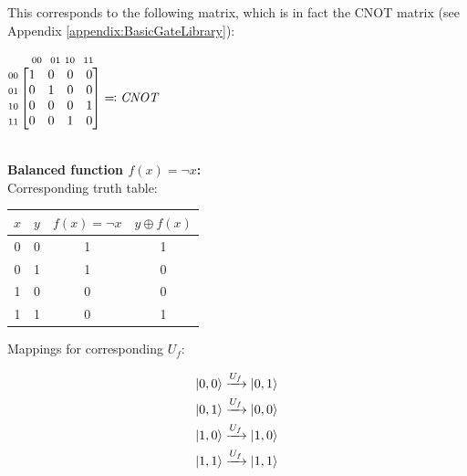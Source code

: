 \documentclass[conference]{IEEEtran}
\begin{document}
\begin{appendices}
This corresponds to the following matrix, which is in fact the CNOT matrix (see Appendix \ref{appendix:BasicGateLibrary}):

\begin{center}
$
\begin{matrix}
    \ \ \ {\scriptstyle 00} \ \ {\scriptstyle 01} \ {\scriptstyle 10} \ \ {\scriptstyle 11} \ \ \ \ \ \ \ \ \ \ \ \ \
    \\
    \begin{matrix}
    {\scriptstyle 00} \\
    {\scriptstyle 01} \\
    {\scriptstyle 10} \\
    {\scriptstyle 11}
    \end{matrix}
    \begin{bmatrix}
    1 & 0 & 0 & 0 \\
    0 & 1 & 0 & 0 \\
    0 & 0 & 0 & 1 \\
    0 & 0 & 1 & 0
    \end{bmatrix}
    \eqcolon \text{\textit{CNOT}}
\end{matrix}
$
\end{center}
 \ \\

\textbf{Balanced function $f(x) = \lnot x$:} \\

Corresponding truth table:

\begin{center}
\begin{tabular}{|c|c|c|c|}
    \hline
    $x$ & $y$ & $f(x) = \lnot x$ & $y \oplus f(x)$\\
    \hline
    0 & 0 & 1 & 1 \\
    0 & 1 & 1 & 0 \\
    1 & 0 & 0 & 0 \\
    1 & 1 & 0 & 1 \\
    \hline
\end{tabular}
\end{center}

Mappings for corresponding $U_f$:

\begin{gather*}
    \ket{0, 0} \xrightarrow{U_f} \ket{0, 1} \\
    \ket{0, 1} \xrightarrow{U_f} \ket{0, 0} \\
    \ket{1, 0} \xrightarrow{U_f} \ket{1, 0} \\
    \ket{1, 1} \xrightarrow{U_f} \ket{1, 1} \\
\end{gather*}


\end{appendices}
\end{document}
